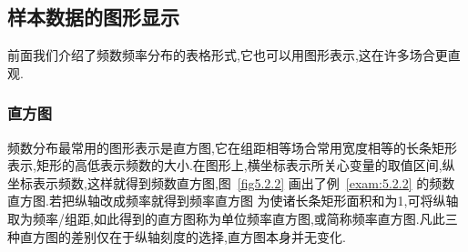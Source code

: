 \subsection{样本数据的图形显示\label{ssec:5.2.3}}
前面我们介绍了频数频率分布的表格形式,它也可以用图形表示,这在许多场合更直观.
\subsubsection{直方图}
频数分布最常用的图形表示是直方图,它在组距相等场合常用宽度相等的长条矩形表示,矩形的高低表示频数的大小.在图形上,横坐标表示所关心变量的取值区间,纵坐标表示频数,这样就得到频数直方图,图~\ref{fig5.2.2} 画出了例~\ref{exam:5.2.2} 的频数直方图.若把纵轴改成频率就得到频率直方图
为使诸长条矩形面积和为1,可将纵轴取为频率/组距,如此得到的直方图称为单位频率直方图,或简称频率直方图.凡此三种直方图的差别仅在于纵轴刻度的选择,直方图本身并无变化.
